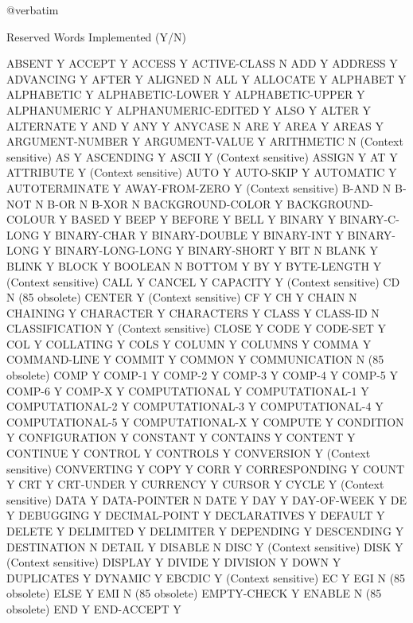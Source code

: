 @verbatim

Reserved Words			Implemented (Y/N)

ABSENT				Y
ACCEPT				Y
ACCESS				Y
ACTIVE-CLASS			N
ADD				Y
ADDRESS				Y
ADVANCING			Y
AFTER				Y
ALIGNED				N
ALL				Y
ALLOCATE			Y
ALPHABET			Y
ALPHABETIC			Y
ALPHABETIC-LOWER		Y
ALPHABETIC-UPPER		Y
ALPHANUMERIC			Y
ALPHANUMERIC-EDITED		Y
ALSO				Y
ALTER				Y
ALTERNATE			Y
AND				Y
ANY				Y
ANYCASE				N
ARE				Y
AREA				Y
AREAS				Y
ARGUMENT-NUMBER			Y
ARGUMENT-VALUE			Y
ARITHMETIC			N (Context sensitive)
AS				Y
ASCENDING			Y
ASCII				Y (Context sensitive)
ASSIGN				Y
AT				Y
ATTRIBUTE			Y (Context sensitive)
AUTO				Y
AUTO-SKIP			Y
AUTOMATIC			Y
AUTOTERMINATE			Y
AWAY-FROM-ZERO			Y (Context sensitive)
B-AND				N
B-NOT				N
B-OR				N
B-XOR				N
BACKGROUND-COLOR		Y
BACKGROUND-COLOUR		Y
BASED				Y
BEEP				Y
BEFORE				Y
BELL				Y
BINARY				Y
BINARY-C-LONG			Y
BINARY-CHAR			Y
BINARY-DOUBLE			Y
BINARY-INT			Y
BINARY-LONG			Y
BINARY-LONG-LONG		Y
BINARY-SHORT			Y
BIT				N
BLANK				Y
BLINK				Y
BLOCK				Y
BOOLEAN				N
BOTTOM				Y
BY				Y
BYTE-LENGTH			Y (Context sensitive)
CALL				Y
CANCEL				Y
CAPACITY			Y (Context sensitive)
CD				N (85 obsolete)
CENTER				Y (Context sensitive)
CF				Y
CH				Y
CHAIN				N
CHAINING			Y
CHARACTER			Y
CHARACTERS			Y
CLASS				Y
CLASS-ID			N
CLASSIFICATION			Y (Context sensitive)
CLOSE				Y
CODE				Y
CODE-SET			Y
COL				Y
COLLATING			Y
COLS				Y
COLUMN				Y
COLUMNS				Y
COMMA				Y
COMMAND-LINE			Y
COMMIT				Y
COMMON				Y
COMMUNICATION			N (85 obsolete)
COMP				Y
COMP-1				Y
COMP-2				Y
COMP-3				Y
COMP-4				Y
COMP-5				Y
COMP-6				Y
COMP-X				Y
COMPUTATIONAL			Y
COMPUTATIONAL-1			Y
COMPUTATIONAL-2			Y
COMPUTATIONAL-3			Y
COMPUTATIONAL-4			Y
COMPUTATIONAL-5			Y
COMPUTATIONAL-X			Y
COMPUTE				Y
CONDITION			Y
CONFIGURATION			Y
CONSTANT			Y
CONTAINS			Y
CONTENT				Y
CONTINUE			Y
CONTROL				Y
CONTROLS			Y
CONVERSION			Y (Context sensitive)
CONVERTING			Y
COPY				Y
CORR				Y
CORRESPONDING			Y
COUNT				Y
CRT				Y
CRT-UNDER			Y
CURRENCY			Y
CURSOR				Y
CYCLE				Y (Context sensitive)
DATA				Y
DATA-POINTER			N
DATE				Y
DAY				Y
DAY-OF-WEEK			Y
DE				Y
DEBUGGING			Y
DECIMAL-POINT			Y
DECLARATIVES			Y
DEFAULT				Y
DELETE				Y
DELIMITED			Y
DELIMITER			Y
DEPENDING			Y
DESCENDING			Y
DESTINATION			N
DETAIL				Y
DISABLE				N
DISC				Y (Context sensitive)
DISK				Y (Context sensitive)
DISPLAY				Y
DIVIDE				Y
DIVISION			Y
DOWN				Y
DUPLICATES			Y
DYNAMIC				Y
EBCDIC				Y (Context sensitive)
EC				Y
EGI				N (85 obsolete)
ELSE				Y
EMI				N (85 obsolete)
EMPTY-CHECK			Y
ENABLE				N (85 obsolete)
END				Y
END-ACCEPT			Y
